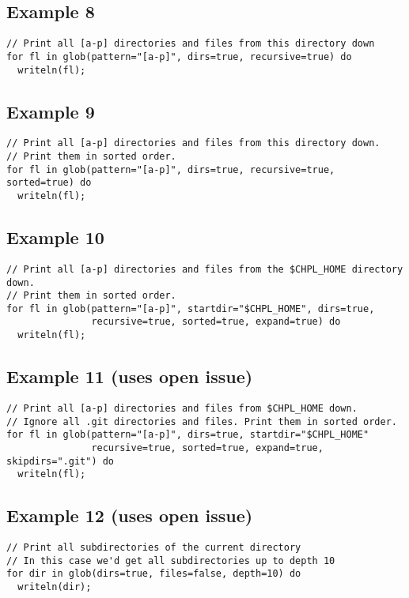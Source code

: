 \documentclass{article}
\begin{document}
\subsection{Example 8}
\begin{lstlisting}
// Print all [a-p] directories and files from this directory down
for fl in glob(pattern="[a-p]", dirs=true, recursive=true) do
  writeln(fl);
\end{lstlisting}

\subsection{Example 9}
\begin{lstlisting}
// Print all [a-p] directories and files from this directory down.
// Print them in sorted order.
for fl in glob(pattern="[a-p]", dirs=true, recursive=true, sorted=true) do
  writeln(fl);
\end{lstlisting}

\subsection{Example 10}
\begin{lstlisting}
// Print all [a-p] directories and files from the $CHPL_HOME directory down.
// Print them in sorted order.
for fl in glob(pattern="[a-p]", startdir="$CHPL_HOME", dirs=true,
               recursive=true, sorted=true, expand=true) do
  writeln(fl);
\end{lstlisting}

\subsection{Example 11 (uses open issue)}
\begin{lstlisting}
// Print all [a-p] directories and files from $CHPL_HOME down.
// Ignore all .git directories and files. Print them in sorted order.
for fl in glob(pattern="[a-p]", dirs=true, startdir="$CHPL_HOME"
               recursive=true, sorted=true, expand=true, skipdirs=".git") do
  writeln(fl);
\end{lstlisting}

\subsection{Example 12 (uses open issue)}
\begin{lstlisting}
// Print all subdirectories of the current directory
// In this case we'd get all subdirectories up to depth 10
for dir in glob(dirs=true, files=false, depth=10) do
  writeln(dir);
\end{lstlisting}


\end{document}
